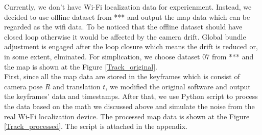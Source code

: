 Currently, we don't have Wi-Fi localization data for experienment. Instead, we decided to use offline dataset from *** and output the map data which can be regarded as the wifi data. To be noticed that the offline dataset should have closed loop otherwise it would be affected by the camera drift. Global bundle adjustment is engaged after the loop closure which means the drift is reduced or, in some extent, elminated. For simplication, we choose dataset 07 from *** and the map is shown at the Figure \ref{Track_original}.\\
First, since all the map data are stored in the keyframes which is consist of camera pose $R$ and translation $t$, we modified the original software and output the keyframes' data and timestamps. After that, we use Python script to process the data based on the math we discussed above and simulate the noise from the real Wi-Fi localization device. The processed map data is shown at the Figure \ref{Track_processed}. The script is attached in the appendix.
